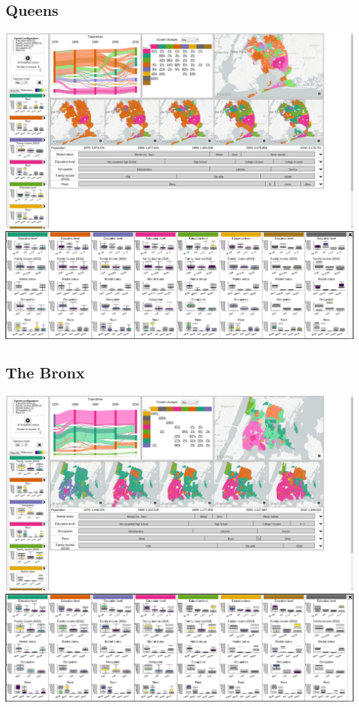 \documentclass[a4paper]{article}
\begin{document}
\subsection{Queens}
\begin{center}
	\includegraphics[width=\linewidth]{13a.png}
	\includegraphics[width=\linewidth]{13b.png}
\end{center} \clearpage



\subsection{The Bronx}
\begin{center}
	\includegraphics[width=\linewidth]{14a.png}
	\includegraphics[width=\linewidth]{14b.png}
\end{center} \clearpage
\end{document}
